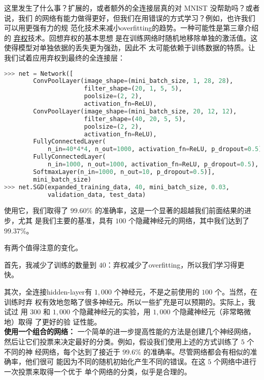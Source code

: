 \label{final_conv}
这里发生了什么事？扩展的，或者额外的全连接层真的对 MNIST 没帮助吗？或者说，我们
的网络有能力做得更好，但我们在用错误的方式学习？例如，也许我们可以用更强有力的规
范化技术来减小\gls*{overfitting}的趋势。一种可能性是第三章介绍的%
\hyperref[sec:other_techniques_for_regularization]{弃权}技术。回想弃权的基本思想
是在训练网络时随机地移除单独的激活值。这使得模型对单独依据的丢失更为强劲，因此不
太可能依赖于训练数据的特质。让我们试着应用弃权到最终的全连接层：
\begin{lstlisting}[language=Python]
>>> net = Network([
        ConvPoolLayer(image_shape=(mini_batch_size, 1, 28, 28), 
                      filter_shape=(20, 1, 5, 5), 
                      poolsize=(2, 2), 
                      activation_fn=ReLU),
        ConvPoolLayer(image_shape=(mini_batch_size, 20, 12, 12), 
                      filter_shape=(40, 20, 5, 5), 
                      poolsize=(2, 2), 
                      activation_fn=ReLU),
        FullyConnectedLayer(
            n_in=40*4*4, n_out=1000, activation_fn=ReLU, p_dropout=0.5),
        FullyConnectedLayer(
            n_in=1000, n_out=1000, activation_fn=ReLU, p_dropout=0.5),
        SoftmaxLayer(n_in=1000, n_out=10, p_dropout=0.5)], 
        mini_batch_size)
>>> net.SGD(expanded_training_data, 40, mini_batch_size, 0.03, 
            validation_data, test_data)
\end{lstlisting}

使用它，我们取得了 $99.60$\% 的准确率，这是一个显著的超越我们前面结果的进步，尤其
是我们主要的基准，具有 $100$ 个隐藏神经元的网络，其中我们达到了 $99.37$\%。

有两个值得注意的变化。

首先，我减少了训练\epochs{}的数量到 $40$：弃权减少了\gls*{overfitting}，所以我们学习得更
快。

其次，全连接\gls*{hidden-layer}有 $1,000$ 个神经元，不是之前使用的 $100$ 个。当然，在训练时弃
权有效地忽略了很多神经元。所以一些扩充是可以预期的。实际上，我试过
用 $300$ 和 $1,000$ 个隐藏神经元的实验，用 $1,000$ 个隐藏神经元（非常略微地）取得
了更好的验
证性能。\\

\textbf{使用一个组合的网络：} 一个简单的进一步提高性能的方法是创建几个神经网络，
然后让它们投票来决定最好的分类。例如，假设我们使用上述的方式训练了 $5$ 个不同的神
经网络，每个达到了接近于 $99.6$\% 的准确率。尽管网络都会有相似的准确率，他们很可
能因为不同的随机初始化产生不同的错误。在这 $5$ 个网络中进行一次投票来取得一个优于
单个网络的分类，似乎是合理的。

